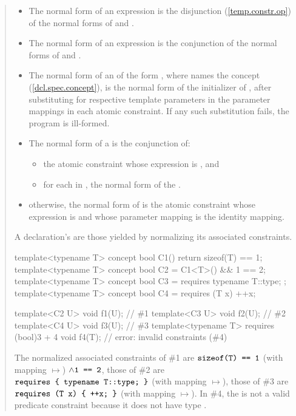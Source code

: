 \begin{quote}
\begin{addedblock}
\begin{itemize}
\item The normal form of an expression  is the  
disjunction (\ref{temp.constr.op}) of the normal forms of  
and .

\item The normal form of an expression  is the  
conjunction of the normal forms of  
and .

\item The normal form of an  of the form
, where  names the concept
 (\ref{dcl.spec.concept}),
is the normal form of the initializer of ,
after substituting  for
 respective template parameters in the
parameter mappings in each atomic constraint.
If any such substitution fails, the program is ill-formed.

\item The normal form of a   is
the conjunction of:
\begin{itemize}
\item the atomic constraint whose expression is , and
\item for each  in , the
normal form of the .
\end{itemize}

\item otherwise, the normal form of  is the atomic constraint
whose expression is  and whose parameter mapping is the
identity mapping.
\end{itemize}
% 
A declaration's  are those
yielded by normalizing its associated constraints.
% 
\enterexample
\begin{codeblock}
template<typename T> concept bool C1() { return sizeof(T) == 1; }
template<typename T> concept bool C2 = C1<T>() && 1 == 2;
template<typename T> concept bool C3 = requires { typename T::type; };
template<typename T> concept bool C4 = requires (T x) { ++x; }

template<C2 U> void f1(U);                            // \#1
template<C3 U> void f2(U);                            // \#2
template<C4 U> void f3(U);                            // \#3
template<typename T> requires (bool)3 + 4 void f4(T); // error: invalid constraints (\#4)
\end{codeblock}
The normalized associated constraints of \#1 are 
$\texttt{sizeof(T) == 1}$ (with mapping $\mapsto$) $\land \texttt{1 == 2}$,
% 
those of \#2 are
$\texttt{requires \{ typename T::type; \}}$ (with mapping $\mapsto$),
%
those of \#3 are
$\texttt{requires (T x) \{ ++x; \}}$ (with mapping $\mapsto$).
% 
In \#4, the  
is not a valid predicate constraint because it does not have type .
\exitexample



\end{addedblock}
\end{quote}
